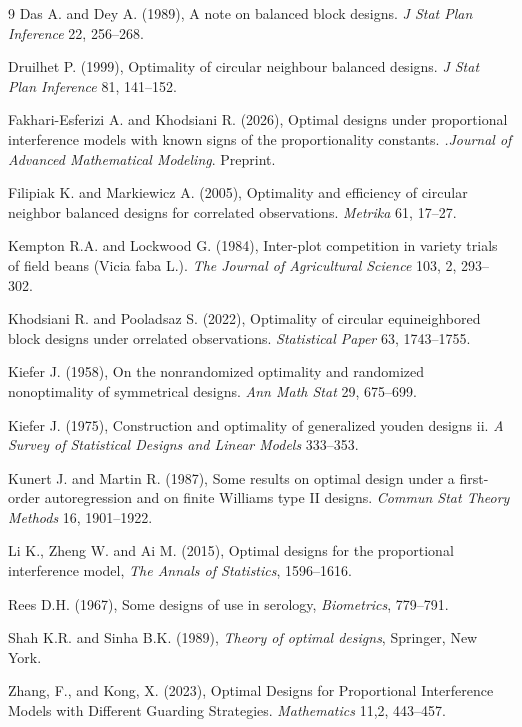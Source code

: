 \documentclass[twoside]{article}
\begin{document}

\begin{thebibliography}{9}
Das A. and Dey A. (1989), A note on balanced block designs. {\it J Stat Plan Inference} 22, 256--268.

Druilhet P. (1999), Optimality of circular neighbour balanced designs. {\it J Stat Plan Inference} 81, 141--152.

Fakhari-Esferizi A. and Khodsiani R. (2026), Optimal designs under proportional interference models with known signs of the proportionality constants. {\it .Journal of Advanced Mathematical Modeling}. Preprint.

Filipiak K. and Markiewicz A. (2005), Optimality and efficiency of circular neighbor balanced designs for correlated observations. {\it Metrika} 61, 17--27.

Kempton R.A. and Lockwood G. (1984), Inter-plot competition in variety trials of field beans (Vicia faba L.). {\it The Journal of Agricultural Science} 103, 2, 293--302.

Khodsiani R. and Pooladsaz S. (2022), Optimality of circular equineighbored block designs under orrelated observations. {\it Statistical Paper} 63, 1743--1755.

Kiefer J. (1958), On the nonrandomized optimality and randomized nonoptimality of symmetrical designs. {\it Ann Math Stat} 29, 675--699.

Kiefer J. (1975), Construction and optimality of generalized youden designs ii. {\it A Survey of Statistical Designs and Linear Models} 333--353.

Kunert J. and Martin R. (1987), Some results on optimal design under a first-order autoregression and on finite Williams type II designs. {\it Commun Stat Theory Methods} 16, 1901--1922.

Li K., Zheng W. and Ai M. (2015), Optimal designs for the proportional interference model, {\it The Annals of Statistics}, 1596--1616.

Rees D.H. (1967), Some designs of use in serology, {\it Biometrics}, 779--791.

Shah K.R. and Sinha B.K. (1989), {\it Theory of optimal designs}, Springer, New York.

Zhang, F., and Kong, X. (2023), Optimal Designs for Proportional Interference Models with Different Guarding Strategies. {\it  Mathematics} 11,2, 443--457.

\end{thebibliography}
 
\end{document}
